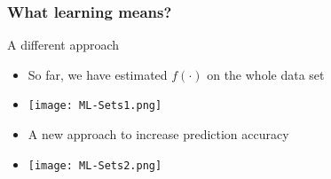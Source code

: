 \documentclass[xcolor=x11names,compress, aspectratio=169]{beamer}
\renewcommand{\(}{\begin{columns}}
\renewcommand{\)}{\end{columns}}
\newcommand{\<}[1]{\begin{column}{#1}}
\renewcommand{\>}{\end{column}}
\begin{document}
\begin{frame}
\frametitle{\textcolor{brique}{ What learning means?}}
A different approach 
\begin{itemize}[<+->]
\item So far, we have estimated $f(\cdot)$ on the whole data set
\item[] \texttt{[image: ML-Sets1.png]}
\item A new approach to increase prediction accuracy
\item[] \texttt{[image: ML-Sets2.png]}
\end{itemize}
\end{frame}
\end{document}
